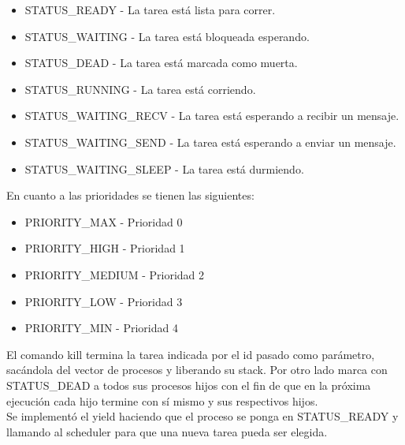 \documentclass[a4paper,10pt]{article}
\begin{document}
\begin{itemize}
 \item STATUS\_READY - La tarea está lista para correr.
 \item STATUS\_WAITING - La tarea está bloqueada esperando.
 \item STATUS\_DEAD - La tarea está marcada como muerta.
 \item STATUS\_RUNNING - La tarea está corriendo.
 \item STATUS\_WAITING\_RECV - La tarea está esperando a recibir un mensaje.
 \item STATUS\_WAITING\_SEND - La tarea está esperando a enviar un mensaje.
 \item STATUS\_WAITING\_SLEEP - La tarea está durmiendo.
\end{itemize}

En cuanto a las prioridades se tienen las siguientes:

\begin{itemize}
 \item PRIORITY\_MAX - Prioridad 0
 \item PRIORITY\_HIGH - Prioridad 1
 \item PRIORITY\_MEDIUM - Prioridad 2
 \item PRIORITY\_LOW - Prioridad 3
 \item PRIORITY\_MIN - Prioridad 4
\end{itemize}


 

El comando kill termina la tarea indicada por el id pasado como parámetro, sacándola del vector de procesos y 
liberando su stack. Por otro lado marca con STATUS\_DEAD a todos sus procesos hijos 
con el fin de que en la próxima ejecución cada hijo termine con sí mismo y sus
respectivos hijos. \\

Se implementó el yield haciendo que el proceso se ponga en STATUS\_READY y llamando 
al scheduler para que una nueva tarea pueda ser elegida.
\end{document}
